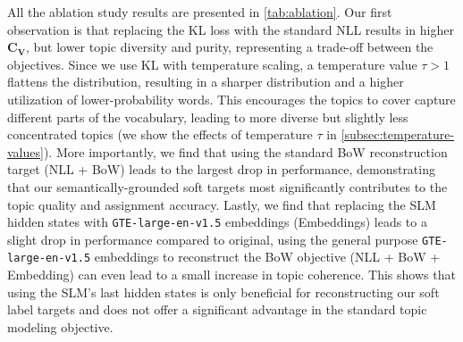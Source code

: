 \documentclass{article}
\theoremstyle{plain}
\theoremstyle{definition}
\theoremstyle{remark}
\begin{document}
All the ablation study results are presented in \autoref{tab:ablation}. 
Our first observation is that replacing the KL loss with the standard NLL results in higher $\mathbf{C_V}$, but lower topic diversity and purity, representing a trade-off between the objectives.
Since we use KL with temperature scaling, a temperature value $\tau > 1$ flattens the distribution, resulting in a sharper distribution and a higher utilization of lower-probability words. This encourages the topics to cover capture different parts of the vocabulary, leading to more diverse but slightly less concentrated topics (we show the effects of temperature $\tau$ in \autoref{subsec:temperature-values}).
More importantly, we find that using the standard BoW reconstruction target (NLL + BoW) leads to the largest drop in performance, demonstrating that our semantically-grounded soft targets most significantly contributes to the topic quality and assignment accuracy. 
Lastly, we find that replacing the SLM hidden states with \texttt{GTE-large-en-v1.5} embeddings (Embeddings) leads to a slight drop in performance compared to original, using the general purpose \texttt{GTE-large-en-v1.5} embeddings to reconstruct the BoW objective (NLL + BoW + Embedding) can even lead to a small increase in topic coherence. This shows that using the SLM's last hidden states is only beneficial for reconstructing our soft label targets and does not offer a significant advantage in the standard topic modeling objective. 
\end{document}
